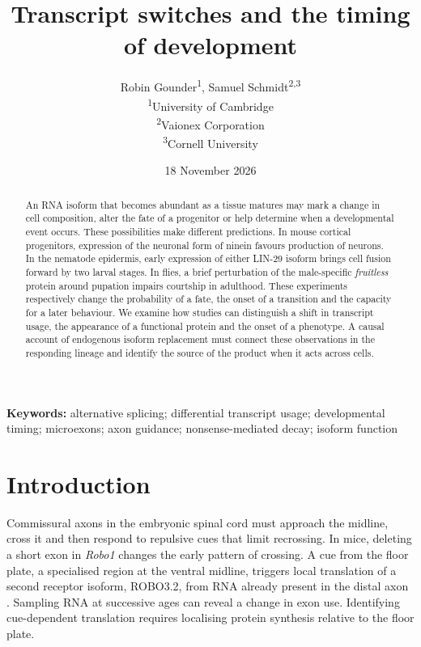 \documentclass[11pt,a4paper]{article}
\title{Transcript switches and the timing of development}
\author{Robin Gounder\textsuperscript{1}, Samuel Schmidt\textsuperscript{2,3}\\[4pt]\small \textsuperscript{1}University of Cambridge\\\small \textsuperscript{2}Vaionex Corporation\\\small \textsuperscript{3}Cornell University}
\date{18 November 2026}
\begin{document}
\maketitle

\begin{abstract}

An RNA isoform that becomes abundant as a tissue matures may mark a change in cell composition, alter the fate of a progenitor or help determine when a developmental event occurs. These possibilities make different predictions. In mouse cortical progenitors, expression of the neuronal form of ninein favours production of neurons. In the nematode epidermis, early expression of either LIN-29 isoform brings cell fusion forward by two larval stages. In flies, a brief perturbation of the male-specific \textit{fruitless} protein around pupation impairs courtship in adulthood. These experiments respectively change the probability of a fate, the onset of a transition and the capacity for a later behaviour. We examine how studies can distinguish a shift in transcript usage, the appearance of a functional protein and the onset of a phenotype. A causal account of endogenous isoform replacement must connect these observations in the responding lineage and identify the source of the product when it acts across cells.

\end{abstract}

\noindent\textbf{Keywords:} alternative splicing; differential transcript usage; developmental timing; microexons; axon guidance; nonsense-mediated decay; isoform function

\clearpage

\section{Introduction}

Commissural axons in the embryonic spinal cord must approach the midline, cross it and then respond to repulsive cues that limit recrossing. In mice, deleting a short exon in \textit{Robo1} changes the early pattern of crossing. A cue from the floor plate, a specialised region at the ventral midline, triggers local translation of a second receptor isoform, ROBO3.2, from RNA already present in the distal axon \cite{Johnson2019,Chen2008,Colak2013}. Sampling RNA at successive ages can reveal a change in exon use. Identifying cue-dependent translation requires localising protein synthesis relative to the floor plate.
\end{document}
